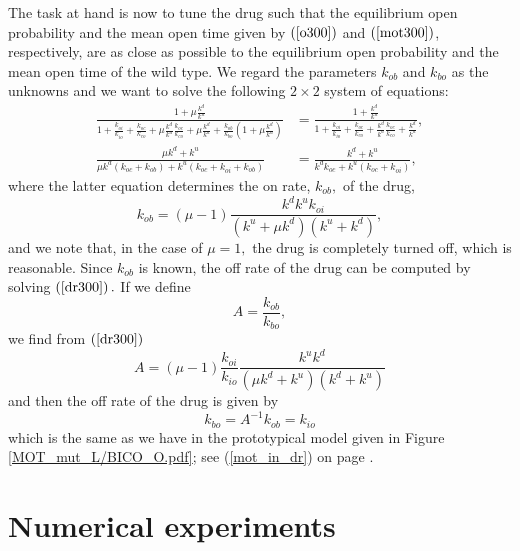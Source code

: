 The task at hand is now to tune the drug such that the equilibrium open
probability and the mean open time given by $\left(  \ref{o300}\right)  $ and
$\left(  \ref{mot300}\right)  $, respectively, are as close as possible to the equilibrium open
probability and the mean open time of the wild type. We regard the parameters
$k_{ob}$ and $k_{bo}$ as the unknowns and we want to solve the following
$2\times2$ system of equations:%
\begin{align}
\frac{1+\mu\frac{k^{d}}{k^{u}}}{1+\frac{k_{oi}}{k_{io}}+\frac{k_{oc}}{k_{co}%
}+\mu\frac{k^{d}}{k^{u}}\frac{k_{oc}}{k_{co}}+\mu\frac{k^{d}}{k^{u}}%
+\frac{k_{ob}}{k_{bo}}\left(  1+\mu\frac{k^{d}}{k^{u}}\right)  }  &  =\frac
{1+\frac{k^{d}}{k^{u}}}{1+\frac{k_{oi}}{k_{io}}+\frac{k_{oc}}{k_{co}}+\frac{k^{d}}{k^{u}}%
\frac{k_{oc}}{k_{co}}+\frac{k^{d}}{k^{u}}},\label{dr300}\\
\frac{\mu k^{d}+k^{u}}{\mu k^{d}\left(  k_{oc}+k_{ob}\right)  +k^{u}\left(
k_{oc}+k_{oi}+k_{ob}\right)  }  &  =\frac{k^{d}+k^{u}}{k^{d}k_{oc}%
+k^{u}\left(  k_{oc}+k_{oi}\right)  }, \label{dr301}%
\end{align}
where the latter equation determines the on rate, $k_{ob},$ of the drug,%
\begin{equation}
k_{ob}=\left(  \mu-1\right)  \frac{k^{d}k^{u}k_{oi}}{\left(  k^{u}+\mu
k^{d}\right)  \left(  k^{u}+k^{d}\right)  }, \label{kob300}%
\end{equation}
and we note that, in the case of $\mu=1,$ the  drug is completely turned off,
which is reasonable. Since $k_{ob}$ is known, the off rate of the drug can be
computed by solving $\left(  \ref{dr300}\right).$ If we define%
\begin{equation}
A=\frac{k_{ob}}{k_{bo}},
\end{equation}
we find from $\left(  \ref{dr300}\right)$  
\begin{equation}
A=(\mu-1)\frac{k_{oi}}{k_{io}}  \frac{k^{u}k^{d}}{\left(  \mu k^{d}+k^{u}\right)  \left(  k^{d}%
+k^{u}\right)  \label{Akbo}}
\end{equation}
and then the off rate of the drug is given by%
\begin{equation}
k_{bo}=A^{-1}k_{ob}=k_{io} \label{kbo300}
\end{equation}
which is the same as we have in the prototypical model given in 
Figure \ref{MOT_mut_L/BICO_O.pdf}; see (\ref{mot_in_dr}) on page \pageref{mot_in_dr}.


\bigskip

\section{Numerical experiments}

